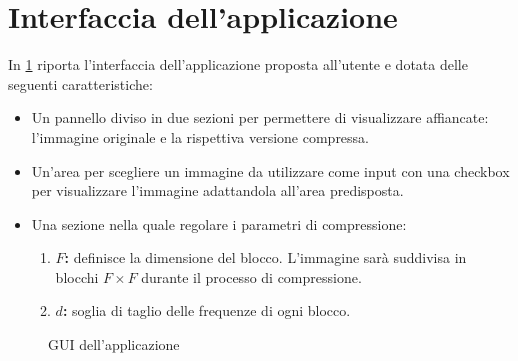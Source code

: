 \documentclass[11pt,italian]{article}
\begin{document}
\section{Interfaccia dell'applicazione}
In \cref{fig:application-window} riporta l’interfaccia dell'applicazione proposta all'utente e dotata delle seguenti caratteristiche:
\begin{itemize}
    \item Un pannello diviso in due sezioni per permettere di visualizzare affiancate: l’immagine originale e la rispettiva versione compressa.
    \item Un'area per scegliere un immagine da utilizzare come input con una checkbox per visualizzare l'immagine adattandola all'area predisposta.
    \item Una sezione nella quale regolare i parametri di compressione:
    \begin{enumerate}
        \item \textbf{$F$:} definisce la dimensione del blocco. L'immagine sarà suddivisa in blocchi $F\times F$ durante il processo di compressione.
        \item \textbf{$d$:} soglia di taglio delle frequenze di ogni blocco.
    \end{enumerate}
\end{itemize}

\begin{figure}[H]
    \caption{GUI dell'applicazione}
    \label{fig:application-window}
\end{figure}
\end{document}
